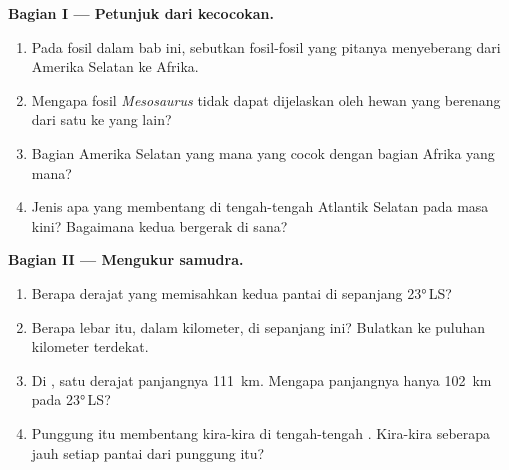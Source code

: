 \begin{problem}
\medskip
\noindent\textbf{Bagian I --- Petunjuk dari kecocokan.}
\begin{enumerate}
  \item Pada  fosil dalam bab ini, sebutkan fosil-fosil yang pitanya
        menyeberang dari Amerika Selatan ke Afrika.
  \item Mengapa fosil \emph{Mesosaurus} tidak dapat dijelaskan oleh hewan
        yang berenang dari satu  ke  yang lain?
  \item Bagian Amerika Selatan yang mana yang cocok dengan bagian Afrika
        yang mana?
  \item Jenis  apa yang membentang di tengah-tengah Atlantik
        Selatan pada masa kini? Bagaimana kedua  bergerak di sana?
\end{enumerate}

\medskip
\noindent\textbf{Bagian II --- Mengukur samudra.}
\begin{enumerate}[resume]
  \item Berapa derajat  yang memisahkan kedua pantai di sepanjang
         \ang{23}\,LS?
  \item Berapa lebar  itu, dalam kilometer, di sepanjang 
        ini? Bulatkan ke puluhan kilometer terdekat.
  \item Di , satu derajat  panjangnya \qty{111}{km}.
        Mengapa panjangnya hanya \qty{102}{km} pada \ang{23}\,LS?
  \item Punggung  itu membentang kira-kira di tengah-tengah .
        Kira-kira seberapa jauh setiap pantai dari punggung itu?
\end{enumerate}


\end{problem}
